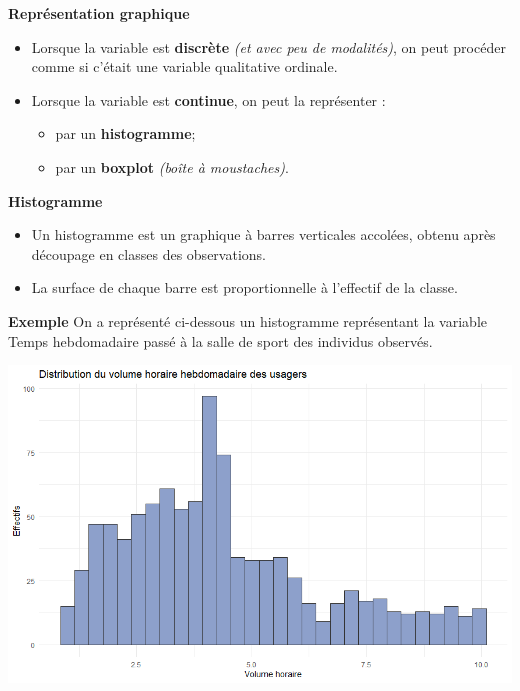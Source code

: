 \documentclass[aspectratio=169,xcolor=dvipsnames]{beamer}
\begin{document}
\begin{frame}
	\begin{block}{\textbf{Représentation graphique}}
		\begin{itemize}
		\item Lorsque la variable est \textbf{discrète} \emph{(et avec peu de modalités)}, on peut procéder comme si c'était une variable qualitative ordinale.
		\item Lorsque la variable est \textbf{continue}, on peut la représenter :
			\begin{itemize}
			\item par un \textbf{histogramme};
			\item  par un \textbf{boxplot} \emph{(boîte à moustaches)}.
			\end{itemize}
		\end{itemize}
	\end{block}
\end{frame}

\begin{frame}
	\begin{block}{\textbf{Histogramme}}
		\begin{itemize}
		\item Un histogramme est un graphique à barres verticales accolées, obtenu après découpage en classes des observations.
		\item La surface de chaque barre est proportionnelle à l'effectif de la classe.
		\end{itemize}
	\end{block}
	
	\begin{exampleblock}{\textbf{Exemple}}
On a représenté ci-dessous un histogramme représentant la variable \og Temps hebdomadaire passé à la salle de sport \fg{} des individus observés.
		\begin{center}
		\includegraphics[scale=0.25]{histo_gym2.png} 
		\end{center}
	\end{exampleblock}
\end{frame}
\end{document}
